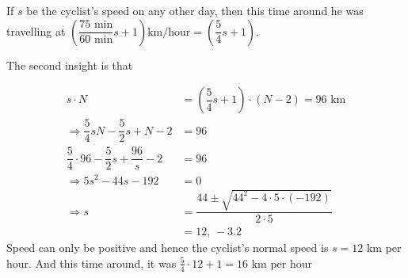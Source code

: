 \begin{solution}[\fullpage]
	If $s$ be the cyclist's speed on any other day, then this time around he was 
	travelling at $\left(\dfrac{75\text{ min}}{60\text{ min}}s + 1\right) \text{km/hour} = \left(\dfrac{5}{4}s + 1\right)$.
	
	The second insight is that 
	
	\begin{align}
		s\cdot N &= \left( \dfrac{5}{4}s + 1 \right)\cdot (N-2) = 96\text{ km} \\
		\Rightarrow \dfrac{5}{4}sN - \dfrac{5}{2}s + N - 2 &= 96 \\
		\dfrac{5}{4}\cdot 96 - \dfrac{5}{2}s + \dfrac{96}{s} - 2 &= 96 \\
		\Rightarrow 5s^2 - 44s - 192 &= 0 \\
		\Rightarrow s &= \dfrac{44\pm\sqrt{44^2-4\cdot 5 \cdot (-192)}}{2\cdot 5} \\
		              &= 12,\, -3.2
	\end{align}
	Speed can only be positive and hence the cyclist's normal speed is $s = 12$ km per hour.
	And this time around, it was $\frac{5}{4}\cdot 12 + 1 = 16$ km per hour
\end{solution}
